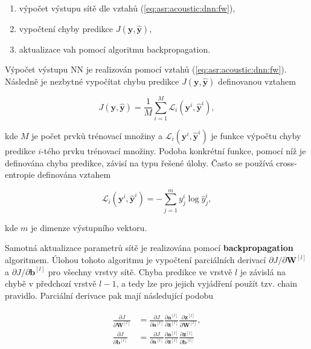 \begin{enumerate}
  \item výpočet výstupu sítě dle vztahů (\ref{eq:asr:acoustic:dnn:fw}),
  \item vypočtení chyby predikce $J\left(\boldsymbol{y}, \hat{\boldsymbol{y}}\right)$,
  \item aktualizace vah pomocí algoritmu backpropagation.
\end{enumerate}

\noindent Výpočet výstupu NN je realizován pomocí vztahů (\ref{eq:asr:acoustic:dnn:fw}). Následně je nezbytné vypočítat chybu predikce $J\left(\boldsymbol{y}, \hat{\boldsymbol{y}}\right)$ definovanou vztahem

\begin{equation}
  J\left(\boldsymbol{y}, \hat{\boldsymbol{y}}\right) = \frac{1}{M} \sum_{i=1}^{M}\mathcal{L}_{i}\left(\boldsymbol{y}^{i}, \hat{\boldsymbol{y}}^{i}\right),
  \label{eq:asr:acoustic:dnn:cost}
\end{equation}

\noindent kde $M$ je počet prvků trénovací množiny a $\mathcal{L}_{i}\left(\boldsymbol{y}^{i}, \hat{\boldsymbol{y}}^{i}\right)$ je funkce výpočtu chyby predikce $i$-tého prvku trénovací množiny. Podoba konkrétní funkce, pomocí níž je definována chyba predikce, závisí na typu řešené úlohy. Často se používá cross-entropie definována vztahem

\begin{equation}
  \mathcal{L}_{i}\left(\boldsymbol{y}^{i}, \hat{\boldsymbol{y}}^{i}\right) = - \sum_{j=1}^{m} y^{i}_{j} \log \hat{y}^{i}_{j},
  \label{eq:asr:acoustic:dnn:cost}
\end{equation}

\noindent kde $m$ je dimenze výstupního vektoru.

Samotná aktualizace parametrů sítě je realizována pomocí \textbf{backpropagation} algoritmem. Úlohou tohoto algoritmu je vypočtení parciálních derivací $\partial J / \partial \mathbf{W}^{[l]}$ a $\partial J/\partial \mathbf{b}^{[l]}$ pro všechny vrstvy sítě. Chyba predikce ve vrstvě $l$ je závislá na chybě v předchozí vrstvě $l-1$, a tedy lze pro jejich vyjádření použít tzv. chain pravidlo. Parciální derivace pak mají následující podobu

\begin{align}
  \begin{split}
    \frac{\partial J}{\partial \mathbf{W}^{[l]}} & = \frac{\partial J}{\partial \mathbf{a}^{[l]}} \frac{\partial \mathbf{a}^{[l]}}{\partial \mathbf{z}^{[l]}} \frac{\partial \mathbf{z}^{[l]}}{\partial \mathbf{W}^{[l]}}, \\
    \frac{\partial J}{\partial \mathbf{b}^{[l]}} & = \frac{\partial J}{\partial \mathbf{a}^{[l]}} \frac{\partial \mathbf{a}^{[l]}}{\partial \mathbf{z}^{[l]}} \frac{\partial \mathbf{z}^{[l]}}{\partial \mathbf{b}^{[l]}}
  \end{split}
  \label{eq:asr:acoustic:dnn:partial}
\end{align}

